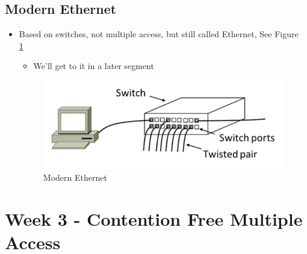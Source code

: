 \documentclass[12pt]{ctexart}   %
\begin{document}
	\subsection{ Modern Ethernet}
	\begin{itemize}
		\item Based on switches, not multiple access, but still called Ethernet, See Figure~ \ref{fig:3-4-12}
		\begin{itemize}
			\item We'll get to it in a later segment
		\end{itemize}
		
		\begin{figure}[h!] %
		\centering
		 \includegraphics[scale=0.7]{images/3-4-12}
		\caption{ Modern Ethernet }
		 \label{fig:3-4-12}
		 \end{figure}
	\end{itemize}

\section{Week 3 - Contention Free Multiple Access}
\end{document}

